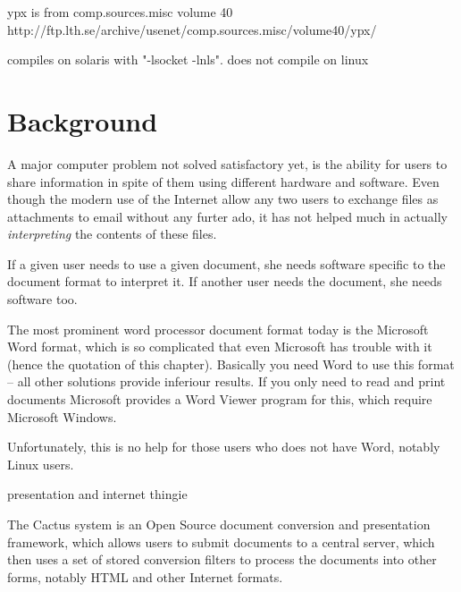 














ypx is from comp.sources.misc volume 40
http://ftp.lth.se/archive/usenet/comp.sources.misc/volume40/ypx/

compiles on solaris with "-lsocket -lnls".  does not compile
on linux



\section{Background}

A major computer problem not solved satisfactory yet, is the
ability for users to share information in spite of them
using different hardware and software.  Even though the
modern use of the Internet allow any two users to exchange
files as attachments to email without any furter ado, it has
not helped much in actually \textit{interpreting} the
contents of these files.

If a given user needs to use a given document, she needs
software specific to the document format to interpret it.
If another user needs the document, she needs software too.

The most prominent word processor document format today is
the Microsoft Word format, which is so complicated that even
Microsoft has trouble with it (hence the quotation of this
chapter).  Basically you need Word to use this format -- all
other solutions provide inferiour results.  If you only need
to read and print documents Microsoft provides a Word Viewer
program for this, which require Microsoft Windows.

Unfortunately, this is no help for those users who does not
have Word, notably Linux users.

\textsf{presentation and internet thingie}




The Cactus system is an Open Source document conversion and
presentation framework, which allows users to submit
documents to a central server, which then uses a set of
stored conversion filters to process the documents into
other forms, notably HTML and other Internet formats.

